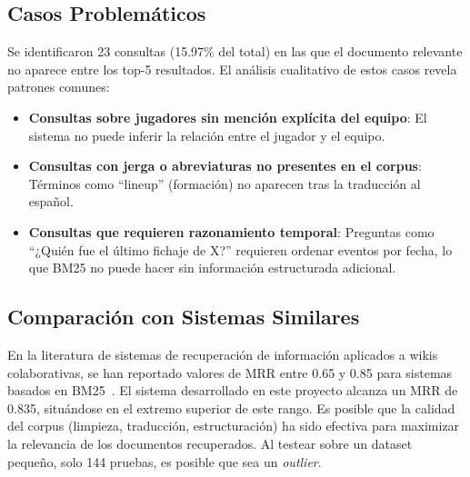 \subsection{Casos Problemáticos}

Se identificaron 23 consultas (15.97\% del total) en las que el documento relevante no aparece entre los top-5 resultados. El análisis cualitativo de estos casos revela patrones comunes:

\begin{itemize}
    \item \textbf{Consultas sobre jugadores sin mención explícita del equipo}: El sistema no puede inferir la relación entre el jugador y el equipo.
    \item \textbf{Consultas con jerga o abreviaturas no presentes en el corpus}: Términos como ``lineup'' (formación) no aparecen tras la traducción al español.
    \item \textbf{Consultas que requieren razonamiento temporal}: Preguntas como ``¿Quién fue el último fichaje de X?'' requieren ordenar eventos por fecha, lo que BM25 no puede hacer sin información estructurada adicional.
\end{itemize}

\subsection{Comparación con Sistemas Similares}

En la literatura de sistemas de recuperación de información aplicados a wikis colaborativas, se han reportado valores de MRR entre 0.65 y 0.85 para sistemas basados en BM25~\cite{robertson2009probabilistic}. El sistema desarrollado en este proyecto alcanza un MRR de 0.835, situándose en el extremo superior de este rango. Es posible que la calidad del corpus (limpieza, traducción, estructuración) ha sido efectiva para maximizar la relevancia de los documentos recuperados. Al testear sobre un dataset pequeño, solo 144 pruebas, es posible que sea un \textit{outlier}.